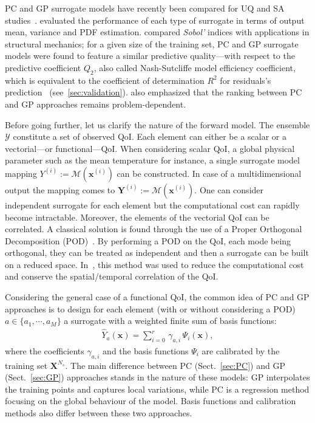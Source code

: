 PC and GP surrogate models have recently been compared for UQ and SA studies~\citep{legratiet2017,owen2015,schoebi2015}. \citet{owen2015} evaluated the performance of each type of surrogate in terms of output mean, variance and PDF estimation. \citet{legratiet2017} compared \emph{Sobol'} indices with applications in structural mechanics; for a given size of the training set, PC and GP surrogate models were found to feature a similar predictive quality---with respect to the predictive coefficient $Q_2$, also called Nash-Sutcliffe model efficiency coefficient, which is equivalent to the coefficient of determination $R^2$ for residuals's prediction~\citep{krause2005} (see~\cref{sec:validation}). \citet{legratiet2017} also emphasized that the ranking between PC and GP approaches remains problem-dependent.

Before going further, let us clarify the nature of the forward model. The ensemble $\mathcal{Y}$ constitute a set of observed QoI. Each element can either be a scalar or a vectorial---or functional---QoI. When considering scalar QoI, a global physical parameter such as the mean temperature for instance, a single surrogate model mapping $Y^{(i)} := \mathcal{M}(\mathbf{x}^{(i)})$ can be constructed. In case of a multidimensional output the mapping comes to $\mathbf{Y}^{(i)} := \mathcal{M}(\mathbf{x}^{(i)})$. One can consider independent surrogate for each element but the computational cost can rapidly become intractable. Moreover, the elements of the vectorial QoI can be correlated. A classical solution is found through the use of a Proper Orthogonal Decomposition (POD)~\cite{anindyachatterjee2000}. By performing a POD on the QoI, each mode being orthogonal, they can be treated as independent and then a surrogate can be built on a reduced space. In~\cite{braconnier2011,margheri2016}, this method was used to reduce the computational cost and conserve the spatial/temporal correlation of the QoI.

Considering the general case of a functional QoI, the common idea of PC and GP approaches is to design for each element (with or without considering a POD) $a \in \{a_1, \cdots, a_M\}$ a surrogate with a weighted finite sum of basis functions:
\begin{align}
\widehat{Y}_a\left(\mathbf{x}\right) = \displaystyle\sum_{i = 0}^{r}\,\gamma_{a,i}\,\Psi_{i}\left(\mathbf{x}\right),
\label{eq:SurrogateForm}
\end{align}
where the coefficients $\gamma_{a,i}$ and the basis functions $\Psi_i$ are calibrated by the training set $\mathbf{X}^{N_s}$. The main difference between PC (Sect.~\ref{sec:PC}) and GP (Sect.~\ref{sec:GP}) approaches stands in the nature of these models: GP interpolates the training points and captures local variations, while PC is a regression method focusing on the global behaviour of the model. Basis functions and calibration methods also differ between these two approaches.

